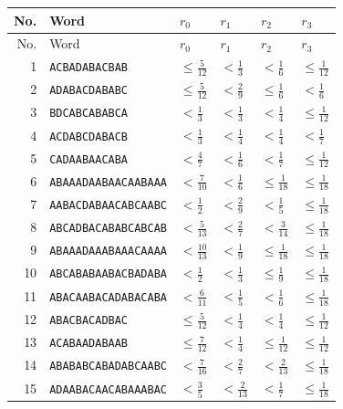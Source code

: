 \documentclass[11pt]{article}
\begin{document}
\begingroup\small
\setlength{\tabcolsep}{4pt}
\begin{longtable}{rlllll}
\toprule
No. & Word & $r_0$ & $r_1$ & $r_2$ & $r_3$\\\midrule
\endfirsthead
\toprule
No. & Word & $r_0$ & $r_1$ & $r_2$ & $r_3$\\\midrule
\endhead
1 & \texttt{ACBADABACBAB} & $\leq \frac{5}{12}$ & $< \frac{1}{3}$ & $< \frac{1}{6}$ & $\leq \frac{1}{12}$ \\
2 & \texttt{ADABACDABABC} & $\leq \frac{5}{12}$ & $< \frac{2}{9}$ & $\leq \frac{1}{6}$ & $< \frac{1}{6}$ \\
3 & \texttt{BDCABCABABCA} & $< \frac{1}{3}$ & $< \frac{1}{3}$ & $< \frac{1}{4}$ & $\leq \frac{1}{12}$ \\
4 & \texttt{ACDABCDABACB} & $< \frac{1}{3}$ & $< \frac{1}{4}$ & $< \frac{1}{4}$ & $< \frac{1}{7}$ \\
5 & \texttt{CADAABAACABA} & $< \frac{4}{7}$ & $< \frac{1}{6}$ & $< \frac{1}{7}$ & $\leq \frac{1}{12}$ \\
6 & \texttt{ABAAADAABAACAABAAA} & $< \frac{7}{10}$ & $< \frac{1}{6}$ & $\leq \frac{1}{18}$ & $\leq \frac{1}{18}$ \\
7 & \texttt{AABACDABAACABCAABC} & $< \frac{1}{2}$ & $< \frac{2}{9}$ & $< \frac{1}{5}$ & $\leq \frac{1}{18}$ \\
8 & \texttt{ABCADBACABABCABCAB} & $< \frac{5}{13}$ & $< \frac{2}{7}$ & $< \frac{3}{14}$ & $\leq \frac{1}{18}$ \\
9 & \texttt{ABAAADAAABAAACAAAA} & $< \frac{10}{13}$ & $< \frac{1}{9}$ & $\leq \frac{1}{18}$ & $\leq \frac{1}{18}$ \\
10 & \texttt{ABCABABAABACBADABA} & $< \frac{1}{2}$ & $< \frac{1}{3}$ & $\leq \frac{1}{9}$ & $\leq \frac{1}{18}$ \\
11 & \texttt{ABACAABACADABACABA} & $< \frac{6}{11}$ & $< \frac{1}{5}$ & $< \frac{1}{6}$ & $\leq \frac{1}{18}$ \\
12 & \texttt{ABACBACADBAC} & $\leq \frac{5}{12}$ & $< \frac{1}{4}$ & $< \frac{1}{4}$ & $\leq \frac{1}{12}$ \\
13 & \texttt{ACABAADABAAB} & $\leq \frac{7}{12}$ & $< \frac{1}{4}$ & $\leq \frac{1}{12}$ & $\leq \frac{1}{12}$ \\
14 & \texttt{ABABABCABADABCAABC} & $< \frac{7}{16}$ & $< \frac{2}{7}$ & $< \frac{2}{13}$ & $\leq \frac{1}{18}$ \\
15 & \texttt{ADAABACAACABAAABAC} & $< \frac{3}{5}$ & $< \frac{2}{13}$ & $< \frac{1}{7}$ & $\leq \frac{1}{18}$ \\

\end{longtable}
\end{document}
